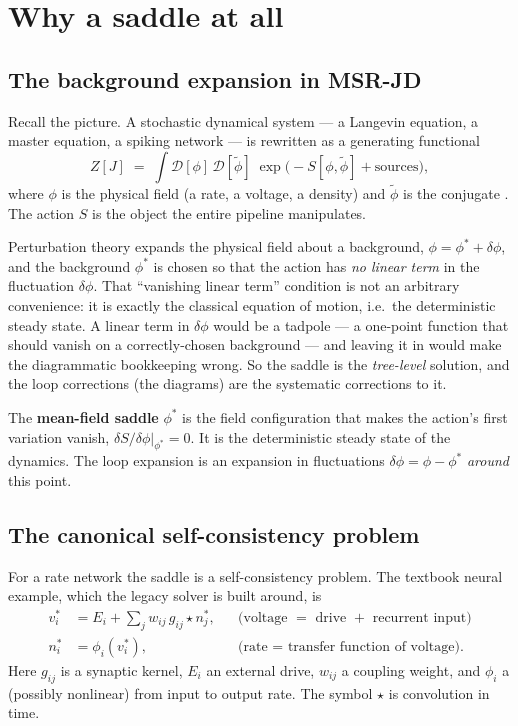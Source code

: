 \section{Why a saddle at all}

\subsection{The background expansion in MSR-JD}

Recall the \msrjd{} picture. A stochastic dynamical system --- a Langevin
equation, a master equation, a spiking network --- is rewritten as a generating
functional
\begin{equation}
  Z[J] \;=\; \int \mathcal{D}[\phi]\,\mathcal{D}[\tilde\phi]\;
    \exp\!\big(-S[\phi,\tilde\phi] + \text{sources}\big),
  \label{eq:mf-genfunc}
\end{equation}
where $\phi$ is the physical field (a rate, a voltage, a density) and
$\tilde\phi$ is the conjugate . The action $S$ is the object
the entire pipeline manipulates.

Perturbation theory expands the physical field about a background,
$\phi = \phi^{*} + \delta\phi$, and the background $\phi^{*}$ is chosen so that
the action has \emph{no linear term} in the fluctuation $\delta\phi$. That
``vanishing linear term'' condition is not an arbitrary convenience: it is
exactly the classical equation of motion, i.e.\ the deterministic steady state.
A linear term in $\delta\phi$ would be a tadpole --- a one-point function that
should vanish on a correctly-chosen background --- and leaving it in would make
the diagrammatic bookkeeping wrong. So the saddle is the \emph{tree-level}
solution, and the loop corrections (the diagrams) are the systematic corrections
to it.

\begin{defn}
The \textbf{mean-field saddle} $\phi^{*}$ is the field configuration that makes
the action's first variation vanish, $\delta S/\delta\phi|_{\phi^{*}} = 0$. It is
the deterministic steady state of the dynamics. The loop expansion is an
expansion in fluctuations $\delta\phi = \phi - \phi^{*}$ \emph{around} this point.
\end{defn}

\subsection{The canonical self-consistency problem}

For a rate network the saddle is a self-consistency problem. The textbook neural
example, which the legacy solver is built around, is
\begin{align}
  v^{*}_i &= E_i + \sum_j w_{ij}\, g_{ij}\!\star n^{*}_j,
    && \text{(voltage $=$ drive $+$ recurrent input)} \label{eq:mf-volt}\\
  n^{*}_i &= \phi_i(v^{*}_i),
    && \text{(rate $=$ transfer function of voltage).} \label{eq:mf-rate}
\end{align}
Here $g_{ij}$ is a synaptic kernel, $E_i$ an external drive, $w_{ij}$ a coupling
weight, and $\phi_i$ a (possibly nonlinear)  from input
to output rate. The symbol $\star$ is convolution in time.

